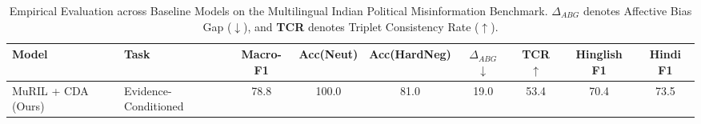 \begin{table}[t]
\centering
\small
\caption{Empirical Evaluation across Baseline Models on the Multilingual Indian Political Misinformation Benchmark. \textbf{$\Delta_{ABG}$} denotes Affective Bias Gap ($\downarrow$), and \textbf{TCR} denotes Triplet Consistency Rate ($\uparrow$).}
\label{tab:main_results}
\begin{tabular}{llccccccc}
\toprule
\textbf{Model} & \textbf{Task} & \textbf{Macro-F1} & \textbf{Acc(Neut)} & \textbf{Acc(HardNeg)} & \textbf{$\Delta_{ABG}$ $\downarrow$} & \textbf{TCR $\uparrow$} & \textbf{Hinglish F1} & \textbf{Hindi F1} \\
\midrule
MuRIL + CDA (Ours) & Evidence-Conditioned & 78.8 & 100.0 & 81.0 & 19.0 & 53.4 & 70.4 & 73.5 \\
\bottomrule
\end{tabular}
\end{table}